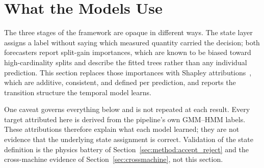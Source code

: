 %
%
%
%

\section{What the Models Use}
\label{sec:explain}

The three stages of the framework are opaque in different ways. The state
layer assigns a label without saying which measured quantity carried the
decision; both forecasters report split-gain importances, which are known to
be biased toward high-cardinality splits and describe the fitted trees rather
than any individual prediction. This section replaces those importances with
Shapley attributions~\cite{lundberg2017shap}, which are additive, consistent,
and defined per prediction, and reports the transition structure the temporal
model learns.

One caveat governs everything below and is not repeated at each result. Every
target attributed here is derived from the pipeline's own GMM--HMM labels.
These attributions therefore explain what each model learned; they are not
evidence that the underlying state assignment is correct. Validation of the
state definition is the physics battery of
Section~\ref{sec:method:accept_reject} and the cross-machine evidence of
Section~\ref{sec:crossmachine}, not this section.

